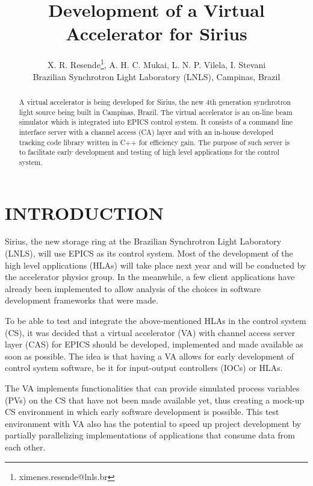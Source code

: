 \documentclass[a4paper,
              ]{jacow}
\begin{document}
\title{Development of a Virtual Accelerator for Sirius}
\author{X. R. Resende\thanks{ximenes.resende@lnls.br}, A. H. C. Mukai, L. N. P. Vilela, I. Stevani \\ Brazilian Synchrotron Light Laboratory (LNLS), Campinas, Brazil}
\maketitle

\begin{abstract}
A virtual accelerator is being developed for Sirius, the new 4th generation synchrotron light source being built in Campinas, Brazil\cite{sirius_status}.
The virtual accelerator is an on-line beam simulator which is integrated into EPICS control system.
It consists of a command line interface server with a channel access (CA) layer and with an in-house developed tracking code library written in C++ for efficiency gain.
The purpose of such server is to facilitate early development and testing of high level applications for the control system.
\end{abstract}

\section{INTRODUCTION}

Sirius, the new storage ring at the Brazilian Synchrotron Light Laboratory (LNLS), will use EPICS as its control system.
Most of the development of the high level applications (HLAs) will take place next year and will be conducted by the accelerator physics group.
In the meanwhile, a few client applications have already been implemented to allow analysis of the choices in software development frameworks\cite{sirius_hla} that were made.

To be able to test and integrate the above-mentioned HLAs in the control system (CS), it was decided that a virtual accelerator (VA) with channel access server layer (CAS) for EPICS should be developed, implemented and made available as soon as possible.
The idea is that having a VA allows for early development of control system software, be it for input-output controllers (IOCs) or HLAs.

The VA implements functionalities that can provide si\-mu\-la\-ted process variables (PVs) on the CS that have not been made available yet, thus creating a mock-up CS environment in which early software development is possible.
This test environment with VA also has the potential to speed up project development by partially parallelizing implementations of applications that consume data from each other.
\end{document}
